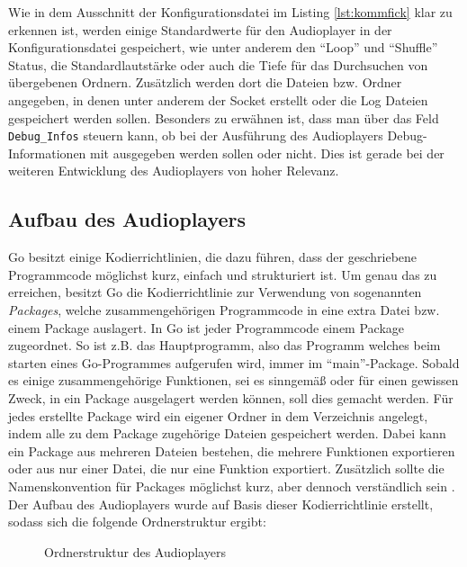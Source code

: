 Wie in dem Ausschnitt  der Konfigurationsdatei im Listing \ref{lst:kommfick}
klar zu erkennen ist, werden einige Standardwerte für den Audioplayer in der
Konfigurationsdatei gespeichert, wie unter anderem den \enquote{Loop} und
\enquote{Shuffle} Status, die Standardlautstärke oder auch die Tiefe für das
Durchsuchen von übergebenen Ordnern. Zusätzlich werden dort die
Dateien bzw. Ordner angegeben, in denen unter anderem der Socket erstellt
oder die Log Dateien gespeichert werden sollen. Besonders zu
erwähnen ist, dass man über das Feld \verb|Debug_Infos| steuern kann, ob bei
der Ausführung des Audioplayers Debug-Informationen mit ausgegeben werden
sollen oder nicht. Dies ist gerade bei der weiteren Entwicklung des
Audioplayers von hoher Relevanz.

\subsection{Aufbau des Audioplayers}
Go besitzt einige Kodierrichtlinien, die dazu führen, dass der geschriebene
Programmcode möglichst kurz, einfach und strukturiert ist. Um genau das zu
erreichen, besitzt Go die Kodierrichtlinie zur Verwendung von sogenannten
\textit{Packages}, welche zusammengehörigen Programmcode in eine extra Datei
bzw. einem Package auslagert. In Go ist jeder Programmcode einem Package
zugeordnet. So ist z.B. das Hauptprogramm, also das Programm welches beim
starten eines Go-Programmes aufgerufen wird, immer im \enquote{main}-Package.
Sobald es einige zusammengehörige Funktionen, sei es sinngemäß oder für
einen gewissen Zweck, in ein Package ausgelagert werden können, soll dies gemacht werden.
Für jedes erstellte Package wird ein eigener Ordner in dem Verzeichnis
angelegt, indem alle zu dem Package zugehörige Dateien gespeichert werden.
Dabei kann ein Package aus mehreren Dateien bestehen, die mehrere Funktionen
exportieren oder aus nur einer Datei, die nur eine Funktion exportiert.
Zusätzlich sollte die Namenskonvention für Packages möglichst kurz, aber
dennoch verständlich sein \autocite{crawshaw_2019}. \\
Der Aufbau des Audioplayers wurde auf Basis dieser Kodierrichtlinie erstellt,
sodass sich die folgende Ordnerstruktur ergibt:
\begin{figure}[H]
\caption{Ordnerstruktur des Audioplayers} 
\end{figure}

